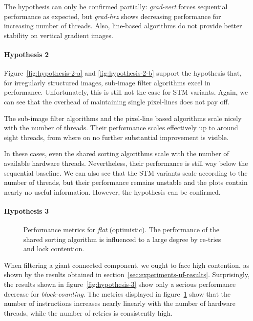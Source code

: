 The hypothesis can only be confirmed partially: \emph{grad-vert} forces
sequential performance as expected, but \emph{grad-hrz} shows decreasing
performance for increasing number of threads. Also, line-based algorithms do not
provide better stability on vertical gradient images.

\paragraph{Hypothesis 2}

Figure~\ref{fig:hypothesis-2-a} and \ref{fig:hypothesis-2-b} support the
hypothesis that, for irregularly structured images, sub-image filter algorithms
excel in performance. Unfortunately, this is still not the case for STM
variants. Again, we can see that the overhead of maintaining single pixel-lines
does not pay off.

The sub-image filter algorithms and the pixel-line based algorithms scale nicely
with the number of threads. Their performance scales effectively up to around
eight threads, from where on no further substantial improvement is visible.

In these cases, even the shared sorting algorithms scale with the number of
available hardware threads. Nevertheless, their performance is still way below
the sequential baseline. We can also see that the STM variants scale according
to the number of threads, but their performance remains unstable and the plots
contain nearly no useful information. However, the hypothesis can be confirmed.

\paragraph{Hypothesis 3}

\begin{figure}
  \centering
  \caption[Performance metrics for \emph{flat} (optimistic).]{Performance
    metrics for \emph{flat} (optimistic). The performance of the shared sorting
    algorithm is influenced to a large degree by re-tries and lock contention.}
  \label{fig:analysis-hypothesis-3}
\end{figure}

When filtering a giant connected component, we ought to face high contention, as
shown by the results obtained in
section~\ref{sec:experiments-uf-results}. Surprisingly, the results shown in
figure~\ref{fig:hypothesis-3} show only a serious performance decrease for
\emph{block-counting}. The metrics displayed in
figure~\ref{fig:analysis-hypothesis-3} show that the number of instructions
increases nearly linearly with the number of hardware threads, while the number
of retries is consistently high.

